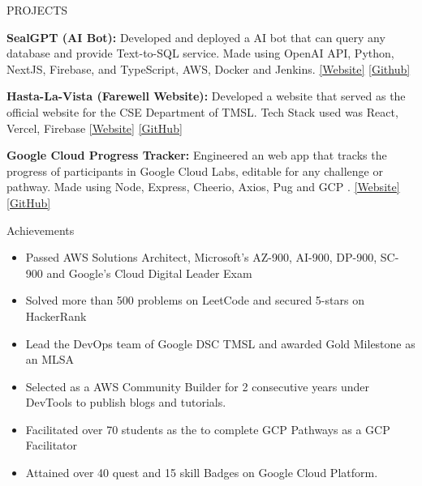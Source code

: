 \documentclass{resume} %
\begin{document}

\begin{rSection}{PROJECTS}
\vspace{-1.25em}

\item \textbf{SealGPT (AI Bot):} {Developed and deployed a AI bot that can query any database and provide Text-to-SQL service. Made using OpenAI API, Python, NextJS, Firebase, and TypeScript, AWS, Docker and Jenkins.}
\href{https://gpt.iamseal.tech/}{[Website]}
\href{https://github.com/Sabyasachi-Seal/SealGPT}{[Github]}

\item \textbf{Hasta-La-Vista (Farewell Website):} {Developed a website that served as the official website for the CSE Department of TMSL. Tech Stack used was React, Vercel, Firebase}
\href{https://hasta-la-vista-cse-tmsl.vercel.app/}{[Website]}
\href{https://github.com/Sabyasachi-Seal/HastaLaVista-2K23}{[GitHub]}

\item \textbf{Google Cloud Progress Tracker:} {Engineered an web app that tracks the progress of participants in Google Cloud Labs, editable for any challenge or pathway. Made using Node, Express, Cheerio, Axios, Pug and GCP .} 
\href {https://qwiklabsprogresstracker.onrender.com/}{[Website]}
\href{https://github.com/Sabyasachi-Seal/QwiklabsProgressTracker}{[GitHub]}
\end{rSection} 

\begin{rSection}{Achievements} 
\begin{itemize}
    \itemsep 1pt {} 
    \item 	Passed AWS Solutions Architect, Microsoft's AZ-900, AI-900, DP-900, SC-900 and Google's Cloud Digital Leader Exam
    \item	Solved more than 500 problems on LeetCode and secured 5-stars on HackerRank
    \item 	Lead the DevOps team of Google DSC TMSL and awarded Gold Milestone as an MLSA
    \item	Selected as a AWS Community Builder for 2 consecutive years under DevTools to publish blogs and tutorials.
    \item	Facilitated over 70 students as the to complete GCP Pathways as a GCP Facilitator
    \item	Attained over 40 quest and 15 skill Badges on Google Cloud Platform.
\end{itemize}


\end{rSection}

\end{document}
